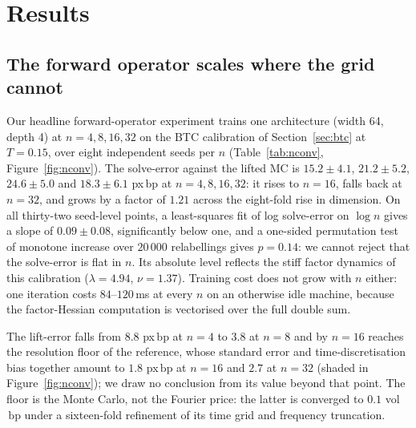 \documentclass[preprint,12pt]{elsarticle}
\newcommand{\bp}{\ensuremath{\,\mathrm{bp}}}
\begin{document}
\section{Results}
\label{sec:results}

\subsection{The forward operator scales where the grid cannot}
\label{sec:nconv}
Our headline forward-operator experiment trains one architecture (width 64,
depth 4) at $n{=}4,8,16,32$ on the BTC calibration of Section~\ref{sec:btc} at
$T{=}0.15$, over eight independent seeds per $n$ (Table~\ref{tab:nconv},
Figure~\ref{fig:nconv}). The solve-error against the lifted MC is $15.2\pm4.1$,
$21.2\pm5.2$, $24.6\pm5.0$ and $18.3\pm6.1$ px\bp{} at $n{=}4,8,16,32$: it rises
to $n{=}16$, falls back at $n{=}32$, and grows by a factor of $1.21$ across the
eight-fold rise in dimension. On all thirty-two seed-level points, a
least-squares fit of log solve-error on $\log n$ gives a slope of $0.09\pm0.08$,
significantly below one, and a one-sided permutation test of monotone increase
over $20\,000$ relabellings gives $p=0.14$: we cannot reject that the solve-error
is flat in $n$. Its absolute level reflects the stiff factor dynamics of this
calibration ($\lambda=4.94$, $\nu=1.37$). Training cost does not grow with $n$
either: one iteration costs $84$--$120$\,ms at every $n$ on an otherwise idle
machine, because the factor-Hessian computation is vectorised over the full
double sum.

The lift-error falls from $8.8$ px\bp{} at $n{=}4$ to $3.8$ at $n{=}8$ and by
$n{=}16$ reaches the resolution floor of the reference, whose standard error and
time-discretisation bias together amount to $1.8$ px\bp{} at $n{=}16$ and $2.7$
at $n{=}32$ (shaded in Figure~\ref{fig:nconv}); we draw no conclusion from its
value beyond that point. The floor is the Monte Carlo, not the Fourier price:
the latter is converged to $0.1$ vol\bp{} under a sixteen-fold refinement of its
time grid and frequency truncation.
\end{document}
